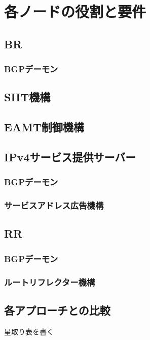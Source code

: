 \section{各ノードの役割と要件}
\subsection{BR}

\subsubsection{BGPデーモン}
\subsection{SIIT機構}
\subsection{EAMT制御機構}



\subsection{IPv4サービス提供サーバー}
\subsubsection{BGPデーモン}
\subsubsection{サービスアドレス広告機構}


\subsection{RR}
\subsubsection{BGPデーモン}
\subsubsection{ルートリフレクター機構}

\subsection{各アプローチとの比較}
星取り表を書く

